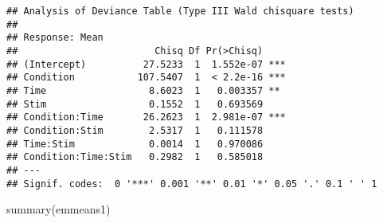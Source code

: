 \documentclass[
]{article}
\newenvironment{Shaded}{\begin{snugshade}}{\end{snugshade}}
\newcommand{\FunctionTok}[1]{\textcolor[rgb]{0.00,0.00,0.00}{#1}}
\newcommand{\NormalTok}[1]{#1}
\begin{document}
\begin{verbatim}
## Analysis of Deviance Table (Type III Wald chisquare tests)
## 
## Response: Mean
##                        Chisq Df Pr(>Chisq)    
## (Intercept)          27.5233  1  1.552e-07 ***
## Condition           107.5407  1  < 2.2e-16 ***
## Time                  8.6023  1   0.003357 ** 
## Stim                  0.1552  1   0.693569    
## Condition:Time       26.2623  1  2.981e-07 ***
## Condition:Stim        2.5317  1   0.111578    
## Time:Stim             0.0014  1   0.970086    
## Condition:Time:Stim   0.2982  1   0.585018    
## ---
## Signif. codes:  0 '***' 0.001 '**' 0.01 '*' 0.05 '.' 0.1 ' ' 1
\end{verbatim}

\begin{Shaded}
\begin{Highlighting}[]
\FunctionTok{summary}\NormalTok{(emmeans1)}
\end{Highlighting}
\end{Shaded}
\end{document}
